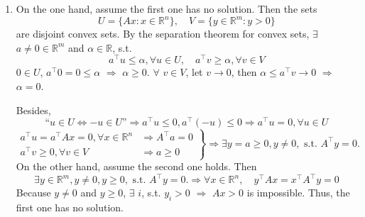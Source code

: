 \documentclass[11pt,letter,notitlepage]{article}
\theoremstyle{definition}
\begin{document}
\begin{solution}
\begin{enumerate}[label=(\arabic*)]
            Second, every point in $C$ can be expressed as a nonnegative combination of at most $m$ linearly independent columns of $A$. Therefore, there are only finite linear independent index sets. For each linear independent index set $I$, $\operatorname{cone}(A_I)$ is closed $\Longrightarrow$ $\operatorname{cone}(A) = \bigcup_{I} \operatorname{cone}(A_I)$ is closed.
            \item 
            On the one hand, assume the first one has no solution. Then the sets
            \[
            U = \{Ax: x\in\mathbb{R}^n\}
            , \quad
            V = \{y \in \mathbb{R}^m: y > 0\}
            \]
            are disjoint convex sets. By the separation theorem for convex sets, $\exists$ $a \neq 0 \in \mathbb{R}^m$ and $\alpha \in \mathbb{R}$, s.t.
            \[
            a^{\top} u \leq \alpha, \forall u \in U
            ,\quad
            a^{\top} v \geq \alpha, \forall v \in V
            \]
            $0 \in U$, $a^{\top} 0 = 0 \leq \alpha$ $\Longrightarrow$ $\alpha \geq 0$.
            $\forall$ $v \in V$, let $v \to 0$, then $\alpha \leq a^{\top} v \to 0$ $\Longrightarrow$ $\alpha = 0$.

            Besides, 
            \[
            \text{``}u \in U
            \Longleftrightarrow
            -u \in U\text{''}
            \Longrightarrow
            a^{\top} u \leq 0, a^{\top} (-u) \leq 0
            \Longrightarrow
            a^{\top} u = 0, \forall u \in U
            \]
            \[
            \left.
            \begin{aligned}
            a^{\top} u = a^{\top} A x = 0, \forall x\in \mathbb{R}^n &\Longrightarrow A^{\top} a = 0\\
            a^{\top} v \geq 0, \forall v \in V &\Longrightarrow a \geq 0
            \end{aligned}
            \right\}
            \Longrightarrow
            \exists y = a \geq 0, y \neq 0, \text{ s.t. } A^{\top} y = 0.
            \]
            On the other hand, assume the second one holds. Then 
            \[
            \exists y \in \mathbb{R}^m, y\neq 0, y \geq 0, \text{ s.t. } A^{\top} y = 0.
            \Longrightarrow 
            \forall x \in \mathbb{R}^n, \quad y^{\top} A x = x^{\top} A^{\top} y = 0
            \]
            Because $y \neq 0$ and $y \geq 0$, $\exists$ $i$, s.t. $y_i > 0$ $\Longrightarrow$ $A x > 0$ is impossible. Thus, the first one has no solution.


\end{enumerate}
\end{solution}
\end{document}
